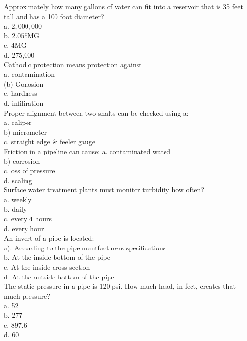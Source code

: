 Approximately how many gallons of vater can fit into a reservoir that is 35 feet tall and has a 100 foot diameter?\\
a. $2,000,000$\\
b. $2.055 \mathrm{MG}$\\
c. $4 \mathrm{MG}$\\
d. 275,000\\

Cathodic protection means protection against\\
a. contamination\\
(b) Gonosion\\
c. hardness\\
d. infiliration\\

Proper alignment between two shafts can be checked using a:\\
a. caliper\\
b) micrometer\\
c. straight edge \& feeler gauge\\

Friction in a pipeline can cause: 
a. contaminated wated \\
b) corrosion \\
c. oss of pressure \\
d. scaling\\

Surface water treatment plants must monitor turbidity how often?\\
a. weekly\\
b. daily\\
c. every 4 hours\\
d. every hour\\

An invert of a pipe is located:\\
a). According to the pipe mantfacturers specifications\\
b. At the inside bottom of the pipe\\
c. At the inside cross section\\
d. At the outside bottom of the pipe\\

The static pressure in a pipe is 120 psi. How much head, in feet, creates that much pressure?\\
a. 52\\
b. 277\\
c. $897.6$\\
d. 60\\

